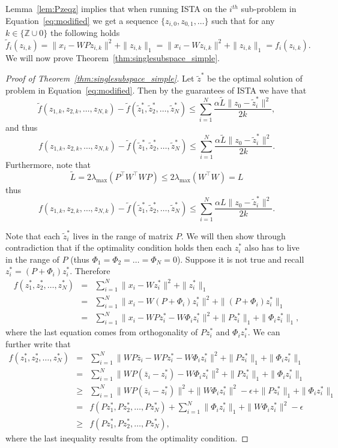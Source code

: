 \documentclass{article} %
\begin{document}
Lemma~\ref{lem:Pzeqz} implies that when running ISTA on the $i^{th}$ sub-problem in Equation~\ref{eq:modified} we get a sequence $\{z_{i,0},z_{0,1},\dots\}$ such that for any $k \in \{\mathbb{Z}\cup 0\}$ the following holds
\[\tilde{f}_i(z_{i,k}) = \|x_i - WPz_{i,k}\|^2 + \|z_{i,k}\|_1 = \|x_i - Wz_{i,k}\|^2 + \|z_{i,k}\|_1 = f_i(z_{i,k}).
\]
We will now prove Theorem~\ref{thm:singlesubspace_simple}.
\begin{proof}[Proof of Theorem~\ref{thm:singlesubspace_simple}]
Let $\tilde{z}^{*}$ be the optimal solution of problem in Equation~\ref{eq:modified}. Then by the guarantees of ISTA we have that
\[\tilde{f}(z_{1,k},z_{2,k},\dots,z_{N,k}) - \tilde{f}(\tilde{z}^{*}_1,\tilde{z}^{*}_2,\dots,\tilde{z}^{*}_N) \leq \sum_{i=1}^{N}\frac{\alpha\tilde{L}\|z_0 - \tilde{z}^{*}_i\|^2}{2k},
\]
and thus
\[f(z_{1,k},z_{2,k},\dots,z_{N,k}) - \tilde{f}(\tilde{z}^{*}_1,\tilde{z}^{*}_2,\dots,\tilde{z}^{*}_N) \leq \sum_{i=1}^{N}\frac{\alpha\tilde{L}\|z_0 - \tilde{z}^{*}_i\|^2}{2k}.
\]
Furthermore, note that 
\[\tilde{L} = 2\lambda_{\max}(P^{\top}W^{\top}WP) \leq 2\lambda_{\max}(W^{\top}W) = L
\]
thus 
\[f(z_{1,k},z_{2,k},\dots,z_{N,k}) - \tilde{f}(\tilde{z}^{*}_1,\tilde{z}^{*}_2,\dots,\tilde{z}^{*}_N) \leq \sum_{i=1}^{N}\frac{\alpha L\|z_0 - \tilde{z}^{*}_i\|^2}{2k}.
\]

Note that each $\tilde{z}^{*}_i$ lives in the range of matrix $P$. We will then show through contradiction that if the optimality condition holds then each $z^{*}_i$ also has to live in the range of $P$ (thus $\Phi_1 = \Phi_2 = \dots = \Phi_N = 0$). Suppose it is not true and recall $z^{*}_i = (P + \Phi_i)z^{*}_i$. Therefore
\begin{eqnarray*}
f(z^{*}_1,z^{*}_2,\dots,z^{*}_N) &=& \sum_{i=1}^N\|x_i - Wz^{*}_i\|^2  + \|z^{*}_i\|_1\\
&=& \sum_{i=1}^N\|x_i - W(P + \Phi_i)z^{*}_i\|^2 + \|(P + \Phi_i)z^{*}_i\|_1\\
&=& \sum_{i=1}^N\|x_i - WPz^{*}_i - W\Phi_i z^{*}_i\|^2 + \|Pz^{*}_i\|_1 + \|\Phi_i z^{*}_i\|_1,
\end{eqnarray*}
where the last equation comes from orthogonality of $Pz^{*}_i$ and $\Phi_i z^{*}_i$. We can further write that
\begin{eqnarray*}
f(z^{*}_1,z^{*}_2,\dots,z^{*}_N) &=& \sum_{i=1}^N\|WP\bar{z}_i - WPz^{*}_i - W\Phi_i z^{*}_i\|^2 + \|Pz^{*}_i\|_1 + \|\Phi_i z^{*}_i\|_1\\
&=& \sum_{i=1}^N\|WP(\bar{z}_i - z^{*}_i) - W\Phi_i z^{*}_i\|^2 + \|Pz^{*}_i\|_1 + \|\Phi_i z^{*}_i\|_1\\
&\geq& \sum_{i=1}^N\|WP(\bar{z}_i - z^{*}_i)\|^2 + \|W\Phi_i z^{*}_i\|^2 - \epsilon + \|Pz^{*}_i\|_1 + \|\Phi_i z^{*}_i\|_1\\
&=& f(Pz^{*}_1,Pz^{*}_2,\dots,Pz^{*}_N) + \sum_{i=1}^N\|\Phi_i z^{*}_i\|_1 + \|W\Phi_i z^{*}_i\|^2 - \epsilon\\
&\geq& f(Pz^{*}_1,Pz^{*}_2,\dots,Pz^{*}_N),
\end{eqnarray*}
where the last inequality results from the optimality condition.
\end{proof}
\end{document}
